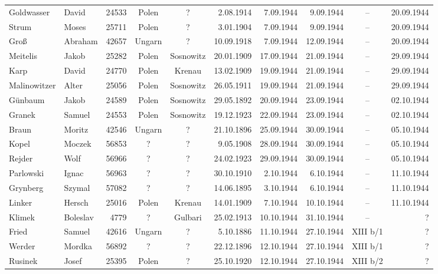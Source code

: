 \begin{tiny}
\begin{longtable}[l]{|l|l|r|c|c|r|r|r|c|r|}
Goldwasser  &  David  & 24533 &  Polen  &  ?  & 2.08.1914 & 7.09.1944 & 9.09.1944 &  --  &  20.09.1944 \\[3pt]
Strum  &  Moses  & 25711 &  Polen  &  ?  & 3.01.1904 & 7.09.1944 & 9.09.1944 &  --  &  20.09.1944 \\[3pt]
Groß  &  Abraham  & 42657 &  Ungarn  &  ?  & 10.09.1918 & 7.09.1944 & 12.09.1944 &  --  &  20.09.1944 \\[3pt]
Meitelis  &  Jakob  & 25282 &  Polen  &  Sosnowitz  & 20.01.1909 & 17.09.1944 & 21.09.1944 &  --  &  29.09.1944 \\[3pt]
Karp   &  David  & 24770 &  Polen  &  Krenau  & 13.02.1909 & 19.09.1944 & 21.09.1944 &  --  &  29.09.1944 \\[3pt]
Malinowitzer  &  Alter  & 25056 &  Polen  &  Sosnowitz  & 26.05.1911 & 19.09.1944 & 21.09.1944 &  --  &  29.09.1944 \\[3pt]
Günbaum  &  Jakob  & 24589 &  Polen  &  Sosnowitz  & 29.05.1892 & 20.09.1944 & 23.09.1944 &  --  &  02.10.1944 \\[3pt]
Granek  &  Samuel  & 24553 &  Polen  &  Sosnowitz  & 19.12.1923 & 22.09.1944 & 23.09.1944 &  --  &  02.10.1944 \\[3pt]
Braun  &  Moritz  & 42546 &  Ungarn  &  ?  & 21.10.1896 & 25.09.1944 & 30.09.1944 &  --  &  05.10.1944 \\[3pt]
Kopel  &  Moczek  & 56853 &  ?  &  ?  & 9.05.1908 & 28.09.1944 & 30.09.1944 &  --  &  05.10.1944 \\[3pt]
Rejder  &  Wolf  & 56966 &  ?  &  ?  & 24.02.1923 & 29.09.1944 & 30.09.1944 &  --  &  05.10.1944 \\[3pt]
Parlowski  &  Ignac  & 56963 &  ?  &  ?  & 30.10.1910 & 2.10.1944 & 6.10.1944 &  --  &  11.10.1944 \\[3pt]
Grynberg  &  Szymal  & 57082 &  ?  &  ?  & 14.06.1895 & 3.10.1944 & 6.10.1944 &  --  &  11.10.1944 \\[3pt]
Linker  &  Hersch  & 25016 &  Polen  &  Krenau  & 14.01.1909 & 7.10.1944 & 10.10.1944 &  --  &  11.10.1944 \\[3pt]
Klimek  &  Boleslav  & 4779 &  ?  &  Gulbari  & 25.02.1913 & 10.10.1944 & 31.10.1944 &  --  &  ? \\[3pt]
Fried  &  Samuel  & 42616 &  Ungarn  &  ?  & 5.10.1886 & 11.10.1944 & 27.10.1944 &  XIII b/1  &  ? \\[3pt]
Werder  &  Mordka  & 56892 &  ?  &  ?  & 22.12.1896 & 12.10.1944 & 27.10.1944 &  XIII b/1  &  ? \\[3pt]
Rusinek  &  Josef  & 25395 &  Polen  &  ?  & 25.10.1920 & 12.10.1944 & 27.10.1944 &  XIII b/2  &  ? \\[3pt]

\end{longtable}
\end{tiny}
